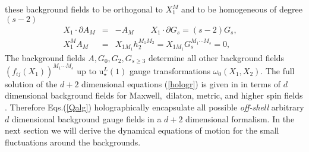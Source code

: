 \documentclass[a4paper,12pt]{article}
\begin{document}
these background fields to be orthogonal to $X_{1}^{M}$ and to be
homogeneous of degree $(s-2)$ 
\begin{eqnarray}
X_{1}\cdot \partial A_{M} &=&-A_{M}\qquad X_{1}\cdot \partial G_{s}=\left(
s-2\right) G_{s},\quad  \label{hologr} \\
X_{1}^{M}A_{M} &=&X_{1M_{1}}h_{2}^{M_{1}M_{2}}=X_{1M_{1}}G_{s}^{M_{1}\cdots
M_{s}}=0,  \label{hologr2}
\end{eqnarray}
The background fields $A,G_{0},G_{2},G_{s\geq 3}$ determine all other
background fields $\left( f_{ij}\left( X_{1}\right) \right) ^{M_{1}\cdots
M_{s}}$ up to u$_{\star }^{L}\left( 1\right) $ gauge transformations $\omega
_{0}\left( X_{1},X_{2}\right) .$ The full solution of the $d+2$ dimensional
equations (\ref{hologr}) is given in \cite{highspin} in terms of $d$
dimensional background fields for Maxwell$,$ dilaton, metric, and higher
spin fields$.$ Therefore Eqs.(\ref{Qalg}) holographically encapsulate all
possible \textit{off-shell} arbitrary $d$ dimensional background gauge
fields in a $d+2$ dimensional formalism. In the next section we will derive
the dynamical equations of motion for the small fluctuations around the
backgrounds.
\end{document}
